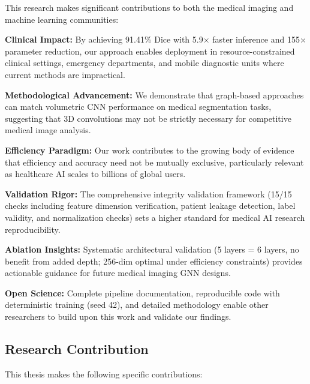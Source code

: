 \documentclass{article}
\begin{document}
This research makes significant contributions to both the medical imaging and machine learning communities:

\textbf{Clinical Impact:} By achieving 91.41\% Dice with 5.9$\times$ faster inference and 155$\times$ parameter reduction, our approach enables deployment in resource-constrained clinical settings, emergency departments, and mobile diagnostic units where current methods are impractical.

\textbf{Methodological Advancement:} We demonstrate that graph-based approaches can match volumetric CNN performance on medical segmentation tasks, suggesting that 3D convolutions may not be strictly necessary for competitive medical image analysis.

\textbf{Efficiency Paradigm:} Our work contributes to the growing body of evidence that efficiency and accuracy need not be mutually exclusive, particularly relevant as healthcare AI scales to billions of global users.

\textbf{Validation Rigor:} The comprehensive integrity validation framework (15/15 checks including feature dimension verification, patient leakage detection, label validity, and normalization checks) sets a higher standard for medical AI research reproducibility.

\textbf{Ablation Insights:} Systematic architectural validation (5 layers = 6 layers, no benefit from added depth; 256-dim optimal under efficiency constraints) provides actionable guidance for future medical imaging GNN designs.

\textbf{Open Science:} Complete pipeline documentation, reproducible code with deterministic training (seed 42), and detailed methodology enable other researchers to build upon this work and validate our findings.

\subsection{Research Contribution}

This thesis makes the following specific contributions:
\end{document}
